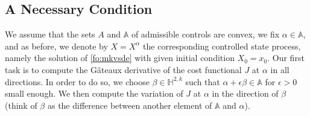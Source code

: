 \documentclass[11pt]{amsart}
\begin{document}
\subsection{\textbf{A Necessary Condition}}
\label{subsec:4:1}
We assume that the sets $A$ and ${\mathbb A}$ of admissible controls are convex, we fix $\alpha\in{\mathbb A}$, and as before, we denote by $ X= X^{\alpha}$ the corresponding controlled state process, namely the solution of \eqref{fo:mkvsde} with given initial condition $X_0=x_{0}$. Our first task is to compute the G\^ateaux derivative of the cost functional $J$ at $\alpha$ in all directions. In order to do so, we choose $\beta\in{\mathbb H}^{2,k}$ such that $\alpha + \epsilon \beta \in {\mathbb A}$ for $\epsilon >0$ small enough. We then compute the variation of $J$ at $\alpha$ in the direction of $\beta$ (think of $\beta$ as the difference between another element of ${\mathbb A}$ and $\alpha$).
\end{document}
